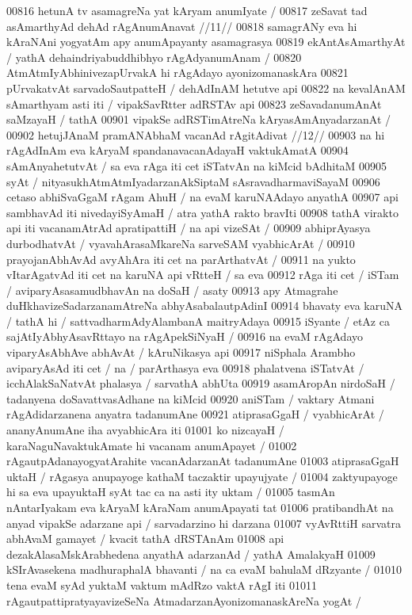00816 	hetunA tv asamagreNa yat kAryam anumIyate /  
00817 	zeSavat tad asAmarthyAd dehAd rAgAnumAnavat //11// 
00818 samagrANy eva hi kAraNAni yogyatAm apy anumApayanty asamagrasya
00819 ekAntAsAmarthyAt / yathA dehaindriyabuddhibhyo rAgAdyanumAnam /
00820 AtmAtmIyAbhinivezapUrvakA hi rAgAdayo ayonizomanaskAra
00821 pUrvakatvAt sarvadoSautpatteH / dehAdInAM hetutve api
00822 na kevalAnAM sAmarthyam asti iti / vipakSavRtter adRSTAv api
00823 zeSavadanumAnAt saMzayaH / tathA  
00901 	vipakSe adRSTimAtreNa kAryasAmAnyadarzanAt /  
00902 	hetujJAnaM pramANAbhaM vacanAd rAgitAdivat //12//  
00903 na hi rAgAdInAm eva kAryaM spandanavacanAdayaH  vaktukAmatA 
00904 sAmAnyahetutvAt / sa eva rAga iti cet iSTatvAn na kiMcid bAdhitaM  
00905 syAt / nityasukhAtmAtmIyadarzanAkSiptaM sAsravadharmaviSayaM
00906 cetaso abhiSvaGgaM rAgam AhuH / na evaM karuNAAdayo anyathA
00907 api sambhavAd iti nivedayiSyAmaH / atra yathA rakto bravIti  
00908 tathA virakto api iti vacanamAtrAd apratipattiH / na api vizeSAt /
00909 abhiprAyasya durbodhatvAt / vyavahArasaMkareNa sarveSAM vyabhicArAt /
00910 prayojanAbhAvAd avyAhAra iti cet na parArthatvAt / 
00911 na yukto vItarAgatvAd iti cet na karuNA api vRtteH /  sa eva
00912 rAga iti cet / iSTam / aviparyAsasamudbhavAn na doSaH / asaty
00913 apy Atmagrahe duHkhavizeSadarzanamAtreNa abhyAsabalautpAdinI
00914 bhavaty eva karuNA / tathA hi / sattvadharmAdyAlambanA maitryAdaya
00915 iSyante / etAz ca sajAtIyAbhyAsavRttayo na rAgApekSiNyaH /
00916 na evaM rAgAdayo viparyAsAbhAve abhAvAt / kAruNikasya api
00917 niSphala Arambho aviparyAsAd iti cet / na / parArthasya eva  
00918 phalatvena iSTatvAt / icchAlakSaNatvAt phalasya / sarvathA abhUta  
00919 asamAropAn nirdoSaH / tadanyena doSavattvasAdhane na kiMcid 
00920 aniSTam / vaktary Atmani rAgAdidarzanena anyatra tadanumAne 
00921 atiprasaGgaH / vyabhicArAt / ananyAnumAne iha avyabhicAra iti 
01001 ko nizcayaH / karaNaguNavaktukAmate hi vacanam anumApayet /  
01002 rAgautpAdanayogyatArahite vacanAdarzanAt tadanumAne
01003 atiprasaGgaH uktaH / rAgasya anupayoge kathaM taczaktir upayujyate / 
01004 zaktyupayoge hi sa eva upayuktaH syAt tac ca na asti ity uktam /  
01005 tasmAn nAntarIyakam eva kAryaM kAraNam anumApayati  tat
01006 pratibandhAt na anyad vipakSe adarzane api / sarvadarzino hi darzana
01007 vyAvRttiH sarvatra abhAvaM gamayet / kvacit tathA dRSTAnAm  
01008 api dezakAlasaMskArabhedena anyathA adarzanAd / yathA AmalakyaH  
01009 kSIrAvasekena madhuraphalA bhavanti / na ca evaM bahulaM dRzyante /  
01010 tena evaM syAd yuktaM vaktum mAdRzo vaktA rAgI iti 
01011 rAgautpattipratyayavizeSeNa AtmadarzanAyonizomanaskAreNa yogAt /
